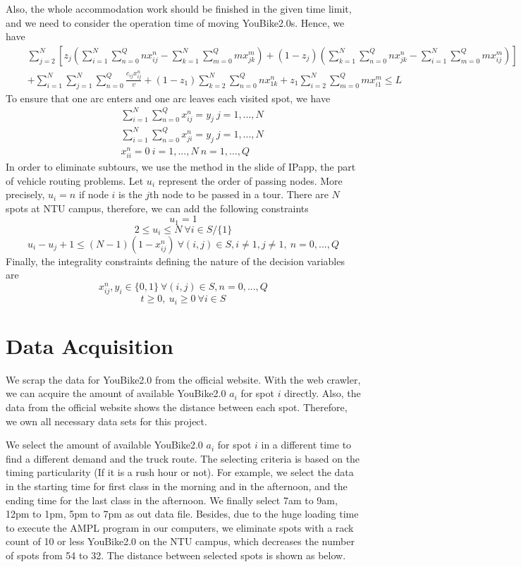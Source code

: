 \documentclass[12pt,a4paper]{article}
\begin{document}
Also, the whole accommodation work should be finished in the given time limit, and we need to consider the operation time of moving YouBike2.0s. Hence, we have
\[\begin{split}
\quad & \sum_{j=2}^N[z_j(\sum_{i=1}^N\sum_{n=0}^Qnx_{ij}^n-\sum_{k=1}^N\sum_{m=0}^Qmx_{jk}^m)+(1-z_j)(\sum_{k=1}^N\sum_{n=0}^Qnx_{jk}^n-\sum_{i=1}^N\sum_{m=0}^Qmx_{ij}^m)] \\
\quad & + \sum_{i=1}^N\sum_{j=1}^N\sum_{n=0}^Q\frac{c_{ij}x_{ij}^n}{v} + (1-z_1)\sum_{k=2}^N\sum_{n=0}^Qnx_{1k}^n + z_1\sum_{i=2}^N\sum_{m=0}^Qmx_{i1}^m \leq L
\end{split}\]
To ensure that one arc enters and one arc leaves each visited spot, we have
\[\begin{split}
    \quad & \sum_{i=1}^N\sum_{n=0}^Qx_{ij}^n = y_j \ j=1,...,N \\
    \quad & \sum_{i=1}^N\sum_{n=0}^Qx_{ji}^n = y_j \ j=1,...,N \\
    \quad & x_{ii}^n = 0 \ i=1,...,N \ n = 1,...,Q
\end{split}\]
In order to eliminate subtours, we use the method in the slide of IPapp, the part of vehicle routing problems. Let $u_i$ represent the order of passing nodes. More precisely, $u_i=n$ if node $i$ is the $j$th node to be passed in a tour. There are $N$ spots at NTU campus, therefore, we can add the following constraints
\[
u_1 = 1
\]
\[
2 \leq u_i \leq N \ \forall i \in S/\{1\}
\]
\[
u_i-u_j+1 \leq (N-1)(1-x_{ij}^n) \ \forall(i,j) \in S,i \neq 1,j \neq 1, \ n = 0,...,Q
\]
Finally, the integrality constraints defining the nature of the decision variables are
\[
    x_{ij}^n, y_{i} \in \{0,1\} \  \forall (i,j) \in S, n=0,...,Q
\]
\[
t \geq 0, \ u_i \geq 0 \ \forall i \in S
\]

\section{Data Acquisition}

We scrap the data for YouBike2.0 from the official website. With the web crawler, we can acquire the amount of available YouBike2.0 $a_i$ for spot $i$ directly. Also, the data from the official website shows the distance between each spot. Therefore, we own all necessary data sets for this project. 

We select the amount of available YouBike2.0 $a_i$ for spot $i$ in a different time to find a different demand and the truck route. The selecting criteria is based on the timing particularity (If it is a rush hour or not). For example, we select the data in the starting time for first class in the morning and in the afternoon, and the ending time for the last class in the afternoon. We finally select 7am to 9am, 12pm to 1pm, 5pm to 7pm as out data file. Besides, due to the huge loading time to execute the AMPL program in our computers, we eliminate spots with a rack count of 10 or less YouBike2.0 on the NTU campus, which decreases the number of spots from 54 to 32. The distance between selected spots is shown as below.
\end{document}
